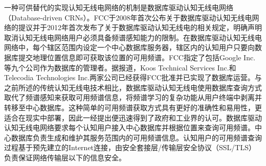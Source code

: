 一种可供替代的实现认知无线电网络的机制是数据库驱动认知无线电网络（Database-driven CRNs）。FCC于2008年首次公布关于数据库驱动认知无线电网络的提议并于2012年首次发布了关于数据库驱动认知无线电的相关规定，明确声明取消认知无线电网络用户必须具备频谱感知能力的限制。在数据库驱动认知无线电网络中，每个辖区范围内设定一个中心数据库服务器，辖区内的认知用户只要向数据库提交地理位置信息即可获取该位置的可用频谱。FCC指定了包括Google Inc.等九个公司作为数据库的管理者。据报道，Koos Technical Services Inc.和Telecodia Technologies Inc.两家公司已经获得FCC批准并已实现了数据库运营。与之前所述的传统认知无线电技术相比，数据库驱动认知无线电使用数据库查询方式取代了频谱感知来获取可用频谱信息，将频谱学习的复杂功能从用户终端中剥离并转移至中心数据库。这种简单的可用频谱获取方式具有更好的准确性和易用性，更适合在现实中部署，因此一经提出便迅速得到了政府和工业界的认可。数据库驱动认知无线电网络要求每个认知用户接入中心数据库并根据位置来查询可用频谱。中心数据库负责生成和维护其服务范围内的可用频谱信息。认知用户的可用频谱查询过程基于预先建立的Internet连接，由安全套接层/传输层安全协议（SSL/TLS）负责保证网络传输层以下的信息安全。



